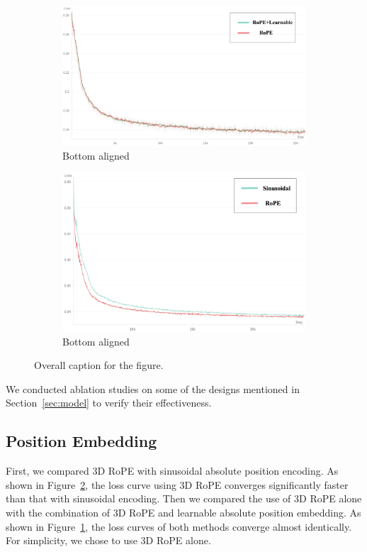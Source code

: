 \begin{figure}[h]
\begin{subfigure}[b]{0.50\textwidth}
        \includegraphics[width=\textwidth]{images/ab_rl.png}
        \caption{Bottom aligned}
        \label{fig:c}
    \end{subfigure}
    \begin{subfigure}[b]{0.46\textwidth}
        \includegraphics[width=\textwidth]{images/ab_sr.png}
        \caption{Bottom aligned}
        \label{fig:d}
    \end{subfigure}
    \caption{Overall caption for the figure.}
    \label{fig:subfigures}
\end{figure}

We conducted ablation studies on some of the designs mentioned in Section~\ref{sec:model} to verify their effectiveness.


\subsection{Position Embedding}
First, we compared 3D RoPE with sinusoidal absolute position encoding. As shown in Figure~\ref{fig:d}, the loss curve using 3D RoPE converges significantly faster than that with sinusoidal encoding.
Then we compared the use of 3D RoPE alone with the combination of 3D RoPE and learnable absolute position embedding. As shown in Figure~\ref{fig:c}, the loss curves of both methods converge almost identically. For simplicity, we chose to use 3D RoPE alone.

